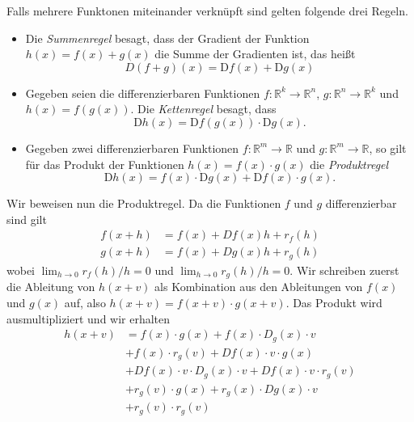 Falls mehrere Funktonen miteinander verknüpft sind gelten folgende drei Regeln.
\begin{itemize}
\item Die \emph{Summenregel} besagt, dass der Gradient der Funktion $h(x)=f(x)+g(x)$ die Summe der Gradienten ist, das heißt
\begin{equation*} D(f + g)(x)=\text{D} f(x)+\text{D} g(x)\end{equation*}

\item Gegeben seien die differenzierbaren Funktionen $f:\mathbb{R}^k\rightarrow\mathbb{R}^n$, $g:\mathbb{R}^n\rightarrow\mathbb{R}^k$ und $h(x)=f(g(x))$. Die \emph{Kettenregel} besagt, dass
\begin{equation*}
\text{D}h(x) = \text{D}f(g(x)) \cdot \text{D} g(x).
\end{equation*}

\item Gegeben zwei differenzierbaren Funktionen $f:\mathbb{R}^m\rightarrow\mathbb{R}$ und $g:\mathbb{R}^m\rightarrow\mathbb{R}$, so gilt für das Produkt der Funktionen $h(x)=f(x) \cdot g(x)$ die \emph{Produktregel} \begin{equation*}\text{D}h(x)=f(x) \cdot \text{D}g(x)+\text{D}f(x) \cdot g(x).\end{equation*}
 \end{itemize}
Wir beweisen nun die Produktregel.
Da die Funktionen $f$ und $g$ differenzierbar sind gilt
\begin{align*}
  f(x+h) &= f(x) +  Df(x) h + r_{f}(h)\\
  g(x+h) &= f(x) + Dg(x) h + r_{g}(h)
\end{align*}
wobei $\lim_{h\rightarrow 0} r_f(h)/h = 0$ und $\lim_{h\rightarrow 0} r_g(h)/h = 0$.
Wir schreiben zuerst die Ableitung von $h(x+v)$ als Kombination aus den Ableitungen von $f(x)$ und $g(x)$ auf, also $h(x+v) =  f(x+v)\cdot g(x+v)$.
Das Produkt wird ausmultipliziert und wir erhalten
\begin{equation*}
\begin{split} h(x+v) & = f(x) \cdot g(x)  + f(x)  \cdot D_{g}(x) \cdot v \\ & + f(x) \cdot r_{g}(v) + Df(x) \cdot v \cdot g(x) \\ & +  Df(x) \cdot v \cdot D_{g}(x) \cdot v  + Df(x) \cdot v \cdot r_{g}(v) \\ & +  r_{g}(v) \cdot g(x) + r_{g}(x) \cdot Dg(x) \cdot v \\ & + r_{g}(v) \cdot r_{g}(v) \end{split} \end{equation*}   %

